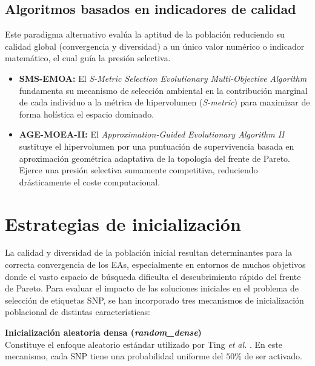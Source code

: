\subsection{Algoritmos basados en indicadores de calidad}
Este paradigma alternativo evalúa la aptitud de la población reduciendo su calidad global (convergencia y diversidad) a un único valor numérico o indicador matemático, el cual guía la presión selectiva.
\begin{itemize}
    \item \textbf{SMS-EMOA:} El \textit{S-Metric Selection Evolutionary Multi-Objective Algorithm} \cite{beume2007sms} fundamenta su mecanismo de selección ambiental en la contribución marginal de cada individuo a la métrica de hipervolumen (\textit{S-metric}) para maximizar de forma holística el espacio dominado.
    \item \textbf{AGE-MOEA-II:} El \textit{Approximation-Guided Evolutionary Algorithm II} \cite{panichella2022adaptive} sustituye el hipervolumen por una puntuación de supervivencia basada en aproximación geométrica adaptativa de la topología del frente de Pareto. Ejerce una presión selectiva sumamente competitiva, reduciendo drásticamente el coste computacional.
\end{itemize}

\section{Estrategias de inicialización}

La calidad y diversidad de la población inicial resultan determinantes para la correcta convergencia de los EAs, especialmente en entornos de muchos objetivos donde el vasto espacio de búsqueda dificulta el descubrimiento rápido del frente de Pareto. Para evaluar el impacto de las soluciones iniciales en el problema de selección de etiquetas SNP, se han incorporado tres mecanismos de inicialización poblacional de distintas características:

\textbf{Inicialización aleatoria densa (\textit{random\_dense})} \\
Constituye el enfoque aleatorio estándar utilizado por Ting \textit{et al.} \cite{ting2010multi}. En este mecanismo, cada SNP tiene una probabilidad uniforme del $50\%$ de ser activado.

